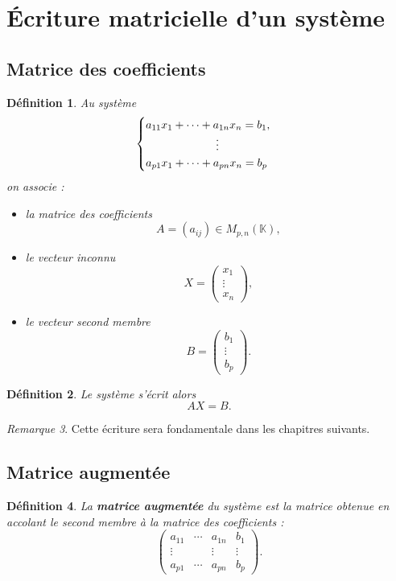 \documentclass[11pt,a4paper]{article}
\newtheorem{definition}{Définition}[section]
\theoremstyle{remark}
\newtheorem{remarque}[definition]{Remarque}
\newcommand{\K}{\mathbb{K}}
\begin{document}
\section{Écriture matricielle d’un système}

\subsection{Matrice des coefficients}

\begin{definition}
Au système
\[
\begin{cases}
a_{11}x_1+\cdots+a_{1n}x_n=b_1,\\
\hspace{2.2cm}\vdots\\
a_{p1}x_1+\cdots+a_{pn}x_n=b_p
\end{cases}
\]
on associe :
\begin{itemize}
    \item la matrice des coefficients
    \[
    A=(a_{ij})\in M_{p,n}(\K),
    \]
    \item le vecteur inconnu
    \[
    X=\begin{pmatrix}x_1\\ \vdots\\ x_n\end{pmatrix},
    \]
    \item le vecteur second membre
    \[
    B=\begin{pmatrix}b_1\\ \vdots\\ b_p\end{pmatrix}.
    \]
\end{itemize}
\end{definition}

\begin{definition}
Le système s’écrit alors
\[
AX=B.
\]
\end{definition}

\begin{remarque}
Cette écriture sera fondamentale dans les chapitres suivants.
\end{remarque}

\subsection{Matrice augmentée}

\begin{definition}
La \textbf{matrice augmentée} du système est la matrice obtenue en accolant le second membre à la matrice des coefficients :
\[
\left(
\begin{array}{ccc|c}
a_{11} & \cdots & a_{1n} & b_1\\
\vdots &        & \vdots & \vdots\\
a_{p1} & \cdots & a_{pn} & b_p
\end{array}
\right).
\]
\end{definition}
\end{document}
